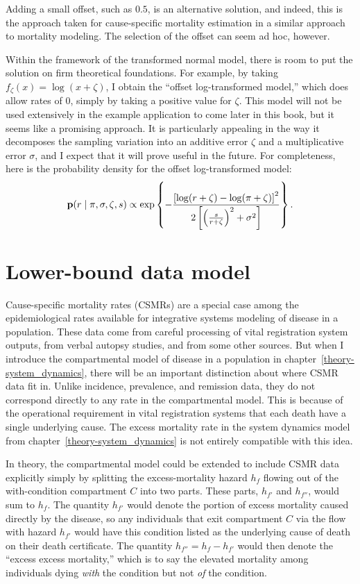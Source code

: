 Adding a small offset, such as $0.5$, is an alternative solution,
and indeed, this is the approach taken for cause-specific mortality
estimation in a similar approach to mortality
modeling.\cite{girosi_demographic_2008} The selection of the offset
can seem ad hoc, however.

Within the framework of the transformed normal model, there is room to
put the solution on firm theoretical foundations.  For example, by
taking $f_\zeta(x) = \log(x + \zeta)$, I obtain the ``offset
log-transformed model,'' which does allow rates of $0$, simply by taking
a positive value for $\zeta$.  This model will not be used extensively
in the example application to come later in this book, but it seems
like a promising approach.  It is particularly appealing in the way it
decomposes the sampling variation into an additive error $\zeta$ and a
multiplicative error $\sigma$, and I expect that it will prove useful
in the future.  For completeness, here is the probability density for
the offset log-transformed model:
\[
\mathbf{p}(r\;|\; \pi, \sigma,\zeta, s)
\propto \exp\left\{
-\frac{\left[\log(r+\zeta)-\log(\pi+\zeta)\right]^2}
      {2\left[\left(\frac{s}{r+\zeta}\right)^2+\sigma^2\right]}
\right\}.
\]

\section{Lower-bound data model}
\label{theory-csmr}
Cause-specific mortality rates (CSMRs) are a special case among the
epidemiological rates available for integrative systems modeling of
disease in a population.  These data come from careful processing of
vital registration system outputs, from verbal autopsy studies, and
from some other sources. But when I introduce the compartmental model
of disease in a population in chapter~\ref{theory-system_dynamics},
there will be an important distinction about where CSMR data fit in.
Unlike incidence, prevalence, and remission data, they do not
correspond directly to any rate in the compartmental model.  This is
because of the operational requirement in vital registration systems
that each death have a single underlying cause.  The excess mortality
rate in the system dynamics model from
chapter~\ref{theory-system_dynamics} is not entirely compatible with
this idea.

In theory, the compartmental model could be extended to include CSMR
data explicitly simply by splitting the excess-mortality hazard $h_f$ flowing out
of the with-condition compartment $C$ into two parts.  These parts,
$h_{f'}$ and $h_{f''}$, would sum to $h_f$. The quantity $h_{f'}$ would denote the portion of
excess mortality caused directly by the disease, so any individuals
that exit compartment $C$ via the flow with hazard $h_{f'}$ would have this condition
listed as the underlying cause of death on their death certificate.
The quantity $h_{f''} = h_{f} - h_{f'}$ would then denote the ``excess excess mortality,''
which is to say the elevated mortality among individuals dying
\emph{with} the condition but not \emph{of} the condition.

